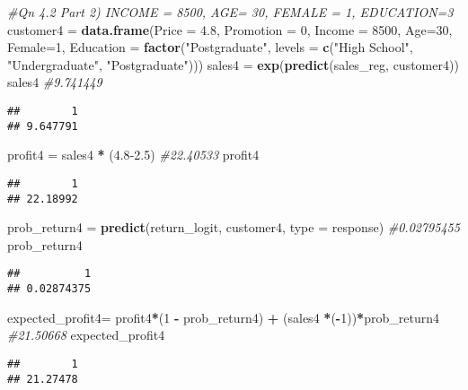 \documentclass[
]{article}
\newenvironment{Shaded}{\begin{snugshade}}{\end{snugshade}}
\newcommand{\AttributeTok}[1]{\textcolor[rgb]{0.13,0.29,0.53}{#1}}
\newcommand{\CommentTok}[1]{\textcolor[rgb]{0.56,0.35,0.01}{\textit{#1}}}
\newcommand{\DecValTok}[1]{\textcolor[rgb]{0.00,0.00,0.81}{#1}}
\newcommand{\FloatTok}[1]{\textcolor[rgb]{0.00,0.00,0.81}{#1}}
\newcommand{\FunctionTok}[1]{\textcolor[rgb]{0.13,0.29,0.53}{\textbf{#1}}}
\newcommand{\NormalTok}[1]{#1}
\newcommand{\OtherTok}[1]{\textcolor[rgb]{0.56,0.35,0.01}{#1}}
\newcommand{\SpecialCharTok}[1]{\textcolor[rgb]{0.81,0.36,0.00}{\textbf{#1}}}
\newcommand{\StringTok}[1]{\textcolor[rgb]{0.31,0.60,0.02}{#1}}
\begin{document}
\begin{Shaded}
\begin{Highlighting}[]
\CommentTok{\#Qn 4.2 Part 2) INCOME = 8500, AGE= 30, FEMALE = 1, EDUCATION=3}
\NormalTok{customer4 }\OtherTok{=} \FunctionTok{data.frame}\NormalTok{(}\AttributeTok{Price =} \FloatTok{4.8}\NormalTok{, }\AttributeTok{Promotion =} \DecValTok{0}\NormalTok{, }\AttributeTok{Income =} \DecValTok{8500}\NormalTok{, }\AttributeTok{Age=}\DecValTok{30}\NormalTok{, }\AttributeTok{Female=}\DecValTok{1}\NormalTok{, }\AttributeTok{Education =} \FunctionTok{factor}\NormalTok{(}\StringTok{"Postgraduate"}\NormalTok{, }\AttributeTok{levels =} \FunctionTok{c}\NormalTok{(}\StringTok{"High School"}\NormalTok{, }\StringTok{"Undergraduate"}\NormalTok{, }\StringTok{"Postgraduate"}\NormalTok{)))}
\NormalTok{sales4 }\OtherTok{=} \FunctionTok{exp}\NormalTok{(}\FunctionTok{predict}\NormalTok{(sales\_reg, customer4))}
\NormalTok{sales4 }\CommentTok{\#9.741449 }
\end{Highlighting}
\end{Shaded}

\begin{verbatim}
##        1 
## 9.647791
\end{verbatim}

\begin{Shaded}
\begin{Highlighting}[]
\NormalTok{profit4 }\OtherTok{=}\NormalTok{ sales4 }\SpecialCharTok{*}\NormalTok{ (}\FloatTok{4.8{-}2.5}\NormalTok{) }\CommentTok{\#22.40533 }
\NormalTok{profit4}
\end{Highlighting}
\end{Shaded}

\begin{verbatim}
##        1 
## 22.18992
\end{verbatim}

\begin{Shaded}
\begin{Highlighting}[]
\NormalTok{prob\_return4 }\OtherTok{=} \FunctionTok{predict}\NormalTok{(return\_logit, customer4, }\AttributeTok{type =} \StringTok{\textquotesingle{}response\textquotesingle{}}\NormalTok{) }\CommentTok{\#0.02795455 }
\NormalTok{prob\_return4}
\end{Highlighting}
\end{Shaded}

\begin{verbatim}
##          1 
## 0.02874375
\end{verbatim}

\begin{Shaded}
\begin{Highlighting}[]
\NormalTok{expected\_profit4}\OtherTok{=}\NormalTok{ profit4}\SpecialCharTok{*}\NormalTok{(}\DecValTok{1} \SpecialCharTok{{-}}\NormalTok{ prob\_return4) }\SpecialCharTok{+}\NormalTok{ (sales4 }\SpecialCharTok{*}\NormalTok{(}\SpecialCharTok{{-}}\DecValTok{1}\NormalTok{))}\SpecialCharTok{*}\NormalTok{prob\_return4 }\CommentTok{\#21.50668 }
\NormalTok{expected\_profit4 }
\end{Highlighting}
\end{Shaded}

\begin{verbatim}
##        1 
## 21.27478
\end{verbatim}
\end{document}

